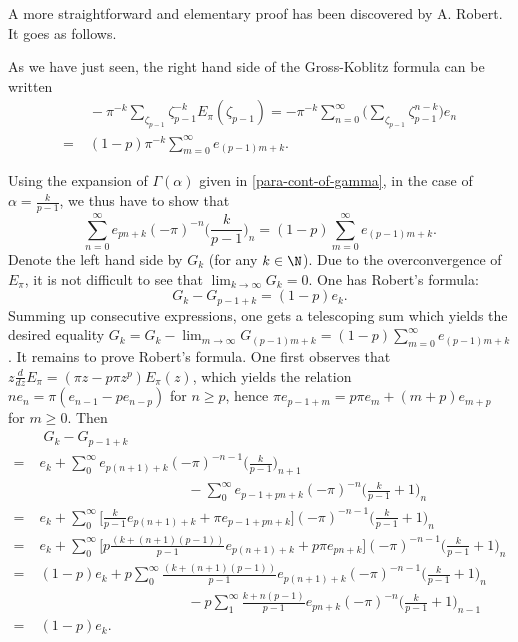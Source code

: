 \begin{para}
 A more straightforward and elementary proof has been discovered
 by A. Robert. It goes as follows.

 As we have just seen, the right hand side of the Gross-Koblitz 
 formula can be written
 \begin{align*}
  &\;-\pi^{-k}\sum_{\zeta_{p-1}}\zeta_{p-1}^{-k}E_\pi(\zeta_{p-1})
  =-\pi^{-k}\sum_{n=0}^{\infty}
  \biggl(\sum_{\zeta_{p-1}}\zeta_{p-1}^{n-k}\biggr) e_n\\
  =&\;(1-p)\pi^{-k}\sum_{m=0}^{\infty} e_{(p-1)m+k}.
 \end{align*}

 Using the expansion of $\Gamma(\alpha)$ given in
 \ref{para-cont-of-gamma}, in the case of $\alpha=\frac{k}{p-1}$, we
 thus have to show that 
 \begin{equation*}
  \sum_{n=0}^{\infty}
   e_{pn+k}(-\pi)^{-n} \biggl(\frac{k}{p-1}\biggr)_n 
   = (1-p)\sum_{m=0}^{\infty} e_{(p-1)m+k}.
 \end{equation*}
 Denote the left hand side by $G_k$ (for any $k\in \N$).
 Due to the overconvergence of $E_\pi$, it is not difficult to see that 
 $\displaystyle\lim_{k\rightarrow \infty}G_k=0$.  One has Robert's formula:
 \begin{equation*}
  G_k-G_{p-1+k}=(1-p)e_k.
 \end{equation*}
 Summing up consecutive expressions, one gets a telescoping sum which yields
 the desired equality $\displaystyle  G_k= G_k-\lim_{m\rightarrow
 \infty}G_{(p-1)m+k} = (1-p)\sum_{m=0}^{\infty} e_{(p-1)m+k}$.
 It remains to prove Robert's formula. One first observes that 
 $z\frac{d}{dz}
 E_\pi=(\pi z-p\pi z^p)E_\pi(z)$, which yields the relation 
 $ne_n=\pi(e_{n-1}-pe_{n-p})$ for $n\geq p$, hence
 $\pi e_{p-1+m}=p\pi e_m + (m+p)e_{m+p}$ for $m\geq 0$. Then 
\begin{align*}
  &\; G_k-G_{p-1+k}\\
 =\;& e_k+ \sum_0^{\infty} e_{p(n+1)+k}(-\pi)^{-n-1}
 \biggl(\frac{k}{p-1}\biggr)_{n+1}\\
 &\phantom{(1-p)e_k+p(1-p)}
 -\sum_0^{\infty} e_{p-1+pn+k}(-\pi)^{-n} \biggl(\frac{k}{p-1}+1\biggr)_n\\
 =\;& e_k+ \sum_0^{\infty}
 \biggl[\frac{k}{p-1}e_{p(n+1)+k}+\pi e_{p-1+pn+k}\biggr]
 (-\pi)^{-n-1} \biggl(\frac{k}{p-1}+1\biggr)_{n}\\
 =\;& e_k + \sum_0^{\infty}
 \biggl[p\frac{(k+(n+1)(p-1))}{p-1}e_{p(n+1)+k}+p\pi e_{pn+k}\biggr]
 (-\pi)^{-n-1} \biggl(\frac{k}{p-1}+1\biggr)_{n}\\
 =\;&(1-p)e_k+p\sum_0^{\infty} \frac{(k+(n+1)(p-1))}{p-1}e_{p(n+1)+k}
 (-\pi)^{-n-1}\biggl(\frac{k}{p-1}+1\biggr)_{n}\\
  &\phantom{(1-p)e_k+p(1-p)}
 - p\sum_1^{\infty} \frac{k+n(p-1)}{p-1} e_{pn+k}(-\pi)^{-n}
 \biggl(\frac{k}{p-1}+1\biggr)_{n-1}\\
 =\;& (1-p)e_k.
\end{align*}
\end{para}

